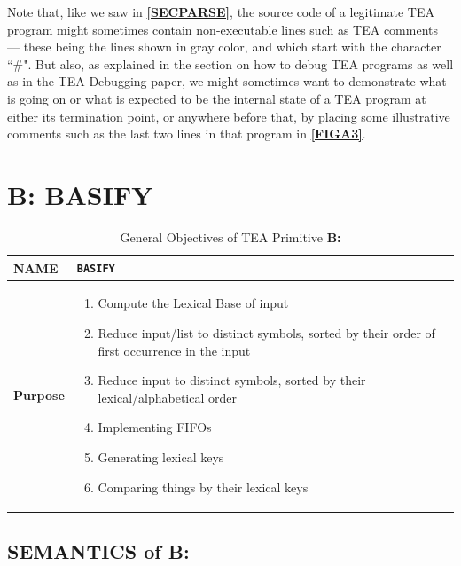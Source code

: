 \documentclass[a4paper, 18pt]{book} %
\begin{document}
Note that, like we saw in \textbf{\autoref{SECPARSE}}, the source code of a legitimate TEA program might sometimes contain non-executable lines such as TEA comments --- these being the lines shown in gray color, and which start with the character ``\#". But also, as explained in the section on how to debug TEA programs as well as in the TEA Debugging paper\cite{Lutalo2025debug}, we might sometimes want to demonstrate what is going on or what is expected to be the internal state of a TEA program at either its termination point, or anywhere before that, by placing some illustrative comments such as the last two lines in that program in \textbf{\autoref{FIGA3}}.




\chapter{B: BASIFY}
\label{CHAPB}


\begin{table}[H]
  \centering
  \LARGE
	\begin{tabular}[t]{|p{}|p{}}
 
	\textbf{NAME} & \texttt{BASIFY}\\
	\hline
	\textbf{Purpose} & \begin{enumerate}
	\item Compute the Lexical Base of input
	\item Reduce input/list to distinct symbols, sorted by their order of first occurrence in the input
	\item Reduce input to distinct symbols, sorted by their lexical/alphabetical order
	\item Implementing FIFOs
	\item Generating lexical keys
	\item Comparing things by their lexical keys
	\end{enumerate}\\
	\hline
	              
\end{tabular}
\caption{General Objectives of TEA Primitive \textbf{B:}}
  \label{TABTAZB}
\end{table}


\section{SEMANTICS of B:}
\label{SECSEMB}
\end{document}
